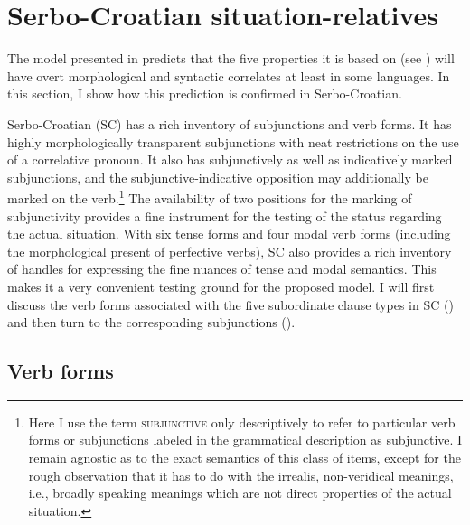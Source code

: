 \documentclass[output=paper,
colorlinks,
citecolor=brown,
newtxmath
]{langscibook}
\begin{document}

\section{Serbo-Croatian situation-relatives}\label{sec:SC-c-rel}

The model presented in  predicts that the five properties it is based on (see ) will have overt morphological and syntactic correlates at least in some languages. In this section, I show how this prediction is confirmed in Serbo-Croatian.

Serbo-Croatian (SC) has a rich inventory of subjunctions and verb forms. It has highly morphologically transparent subjunctions with neat restrictions on the use of a correlative pronoun. It also has subjunctively as well as indicatively marked subjunctions, and the subjunctive-indicative opposition may additionally be marked on the verb.\footnote{Here I use the term \textsc{subjunctive} only descriptively to refer to particular verb forms or subjunctions labeled in the grammatical description as subjunctive. I remain agnostic as to the exact semantics of this class of items, except for the rough observation that it has to do with the irrealis, non-veridical meanings, i.e., broadly speaking meanings which are not direct properties of the actual situation.} The availability of two positions for the marking of subjunctivity provides a fine instrument for the testing of the status regarding the actual situation. With six tense forms and four modal verb forms (including the morphological present of perfective verbs), SC also provides a rich inventory of handles for expressing the fine nuances of tense and modal semantics. This makes it a very convenient testing ground for the proposed model. I will first discuss the verb forms associated with the five subordinate clause types in SC  () and then turn to the corresponding subjunctions ().

\subsection{Verb forms}\label{verbforms}
\end{document}
